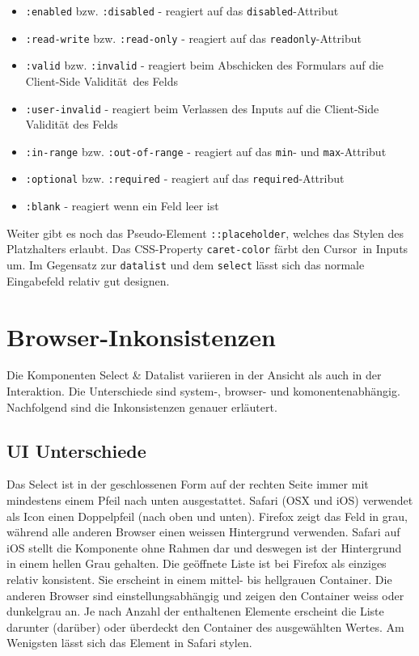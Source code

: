 \begin{itemize}
    \item \texttt{:enabled} bzw. \texttt{:disabled} - reagiert auf das \texttt{disabled}-Attribut
    \item \texttt{:read-write} bzw. \texttt{:read-only} - reagiert auf das \texttt{readonly}-Attribut
    \item \texttt{:valid} bzw. \texttt{:invalid} - reagiert beim Abschicken des Formulars auf die Client-Side Validität\footnotemark \ des Felds
    \item \texttt{:user-invalid} - reagiert beim Verlassen des Inputs auf die Client-Side Validität des Felds
    \item \texttt{:in-range} bzw. \texttt{:out-of-range} - reagiert auf das \texttt{min}- und \texttt{max}-Attribut
    \item \texttt{:optional} bzw. \texttt{:required} - reagiert auf das \texttt{required}-Attribut
    \item \texttt{:blank} - reagiert wenn ein Feld leer ist
\end{itemize}

Weiter gibt es noch das Pseudo-Element \texttt{::placeholder}, welches das Stylen des Platzhalters erlaubt.
Das CSS-Property \texttt{caret-color} färbt den Cursor\footnotemark \ in Inputs um.
Im Gegensatz zur \texttt{datalist} und dem \texttt{select} lässt sich das normale Eingabefeld relativ gut designen. 


\clearpage
\section{Browser-Inkonsistenzen}
\label{sec:browserInconsistency}

Die Komponenten Select \& Datalist variieren in der Ansicht als auch in der Interaktion. 
Die Unterschiede sind system-, browser- und komonentenabhängig. 
Nachfolgend sind die Inkonsistenzen genauer erläutert. 


\subsection{UI Unterschiede}
\label{sec:uiDifferences}

Das Select ist in der geschlossenen Form auf der rechten Seite immer mit mindestens einem Pfeil nach unten ausgestattet.
Safari (OSX und iOS) verwendet als Icon einen Doppelpfeil (nach oben und unten).
Firefox zeigt das Feld in grau, während alle anderen Browser einen weissen Hintergrund verwenden.
Safari auf iOS stellt die Komponente ohne Rahmen dar und deswegen ist der Hintergrund in einem hellen Grau gehalten.
Die geöffnete Liste ist bei Firefox als einziges relativ konsistent. 
Sie erscheint in einem mittel- bis hellgrauen Container.
Die anderen Browser sind einstellungsabhängig und zeigen den Container weiss oder dunkelgrau an.
Je nach Anzahl der enthaltenen Elemente erscheint die Liste darunter (darüber) oder überdeckt den Container des ausgewählten Wertes.
Am Wenigsten lässt sich das Element in Safari stylen.

